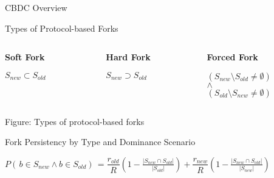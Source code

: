 \documentclass[handout]{beamer}
\begin{document}
\begin{frame}{CBDC Overview}
\begin{frame}{Types of Protocol-based Forks}
\begin{columns}[T]
	\begin{column}{0.3\textwidth}
		\center		
		\textbf{Soft Fork}\\
		\vspace{0.5em}
		\begin{figure}[h]
  			\resizebox{0.9\textwidth}{!}{
			
			}
		\end{figure}
		\vspace{1em}
		$S_{new}\subset S_{old}$
	\end{column}
	\begin{column}{0.3\textwidth}
		\center
 		\textbf{Hard Fork}\\
 		\vspace{1em}
 		\begin{figure}[h]
  			\center
  			\resizebox{0.9\textwidth}{!}{
			
			}
		\end{figure}
 		\vspace{1.5em}
 		$S_{new}\supset S_{old}$
	\end{column}
		\begin{column}{0.3\textwidth}
		\center
 		\textbf{Forced Fork}\\
 		\vspace{0.5em}
 		\begin{figure}[h]
  			\center
  			\resizebox{0.9\textwidth}{!}{
			
			}
		\end{figure}
		\vspace{0.8em}
 		$(S_{new}\setminus S_{old} \neq \emptyset)$\\$\wedge$\\ $(S_{old}\setminus S_{new} \neq \emptyset)$
	\end{column}
\end{columns}

\vspace{0.5em}

\begin{center}
	Figure: Types of protocol-based forks \cite{schar2020blockchain}
\end{center}

	
\end{frame}

\begin{frame}{Fork Persistency by Type and Dominance Scenario}

\center \footnotesize
$P(\,b \in S_{new} \wedge b \in S_{old})\, = \dfrac{r_{old}}{R} \left( 1-\frac{|S_{new} \cap S_{old}|}{|S_{old}|}\right) + \dfrac{r_{new}}{R} \left( 1-\frac{|S_{new} \cap S_{old}|}{|S_{new}|}\right)$ 
\label{eq:forkprobability}


\end{frame}
\end{frame}
\end{document}
